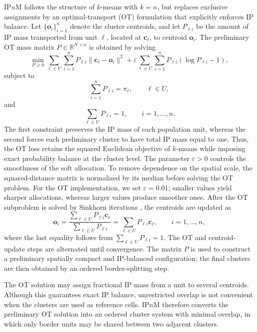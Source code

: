 \documentclass[12pt]{imsart}
\theoremstyle{plain}
\theoremstyle{remark}
\begin{document}
IP\(n\)M follows the structure of \(k\)-means with \(k=n\), but replaces
exclusive assignments by an optimal-transport (OT) formulation that explicitly
enforces IP balance. Let \(\{\bm o_i\}_{i=1}^n\) denote the cluster centroids,
and let \(P_{\ell i}\) be the amount of IP mass transported from unit
\(\ell\), located at \(\bm c_\ell\), to centroid \(\bm o_i\). The preliminary
OT mass matrix \(P\in\mathbb R^{N\times n}\) is obtained by solving
\[
\min_{P\geq 0}
\sum_{\ell\in U}\sum_{i=1}^{n}
P_{\ell i}\|\bm c_\ell-\bm o_i\|^2
+
\varepsilon
\sum_{\ell\in U}\sum_{i=1}^{n}
P_{\ell i}(\log P_{\ell i}-1),
\]
subject to
\[
\sum_{i=1}^{n}P_{\ell i}=\pi_\ell,\qquad \ell\in U,
\]
and
\[
\sum_{\ell\in U}P_{\ell i}=1,\qquad i=1,\ldots,n .
\]
The first constraint preserves the IP mass of each population unit, whereas
the second forces each preliminary cluster to have total IP mass equal to one.
Thus, the OT loss retains the squared Euclidean objective of \(k\)-means while
imposing exact probability balance at the cluster level. The parameter
\(\varepsilon>0\) controls the smoothness of the soft allocation. 
To remove dependence on the spatial scale, the squared-distance matrix is
normalized by its median before solving the OT problem. For the OT implementation, we set \(\varepsilon=0.01\); smaller values yield
sharper allocations, whereas larger values produce smoother ones. After the OT
subproblem is solved by Sinkhorn iterations \citep{cuturi2013}, the centroids are updated as
\[
\bm o_i
=
\frac{\sum_{\ell\in U}P_{\ell i}\bm c_\ell}
     {\sum_{\ell\in U}P_{\ell i}}
=
\sum_{\ell\in U}P_{\ell i}\bm c_\ell,
\qquad i=1,\ldots,n,
\]
where the last equality follows from
\(\sum_{\ell\in U}P_{\ell i}=1\). The OT and centroid-update steps are
alternated until convergence. The matrix \(P\) is used to construct a
preliminary spatially compact and IP-balanced configuration; the final
clusters are then obtained by an ordered border-splitting step.

The OT solution may assign fractional IP mass from a unit to several
centroids. Although this guarantees exact IP balance, unrestricted overlap is
not convenient when the clusters are used as reference cells. IP\(n\)M
therefore converts the preliminary OT solution into an ordered cluster system
with minimal overlap, in which only border units may be shared between two
adjacent clusters.
\end{document}

